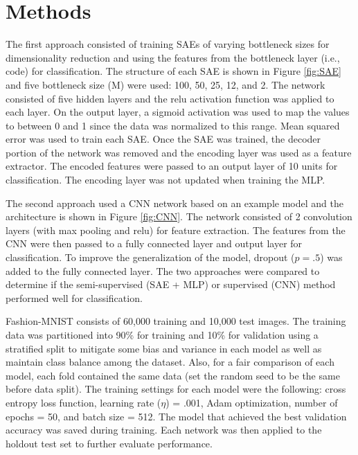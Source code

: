 \documentclass[conference]{IEEEtran}
\begin{document}
\section{Methods}
	The first approach consisted of training SAEs of varying bottleneck sizes for dimensionality reduction and using the features from the bottleneck layer (i.e., code) for classification. The structure of each SAE is shown in Figure \ref{fig:SAE} and five bottleneck size (M) were used: 100, 50, 25, 12, and 2. The network consisted of five hidden layers and the relu activation function was applied to each layer. On the output layer, a sigmoid activation was used to map the values to between 0 and 1 since the data was normalized to this range. Mean squared error was used to train each SAE. Once the SAE was trained, the decoder portion of the network was removed and the encoding layer was used as a feature extractor. The encoded features were passed to an output layer of 10 units for classification. The encoding layer was not updated when training the MLP. 
	
	The second approach used a CNN network based on an example model\cite{paszke_2016} and the architecture is shown in Figure \ref{fig:CNN}. The network consisted of 2 convolution layers (with max pooling and relu) for feature extraction. The features from the CNN were then passed to a fully connected layer and output layer for classification.  To improve the generalization of the model, dropout ($p=.5$) was added to the fully connected layer. The two approaches were compared to determine if the semi-supervised (SAE + MLP) or supervised (CNN) method performed well for classification. 

	Fashion-MNIST consists of 60,000 training and 10,000 test images. The training data was partitioned into 90\% for training and 10\% for validation using a stratified split to mitigate some bias and variance in each model as well as maintain class balance among the dataset. Also, for a fair comparison of each model, each fold contained the same data (set the random seed to be the same before data split). The training settings for each model were the following: cross entropy loss function, learning rate ($\eta$) = .001, Adam\cite{kingma2014adam} optimization, number of epochs = 50, and batch size = 512. The model that achieved the best validation accuracy was saved during training. Each network was then applied to the holdout test set to further evaluate performance.
	
\end{document}
